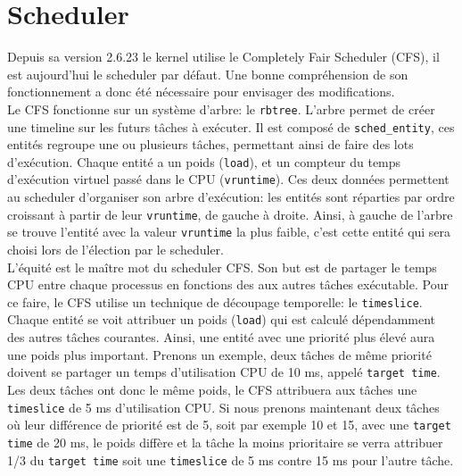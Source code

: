 \section*{Scheduler}

Depuis sa version 2.6.23 le kernel utilise le Completely Fair Scheduler (CFS), il est aujourd'hui le scheduler par défaut. Une bonne compréhension de son fonctionnement a donc été nécessaire pour envisager des modifications.
\\

Le CFS fonctionne sur un système d'arbre: le \verb|rbtree|. L'arbre permet de créer une timeline sur les futurs tâches à exécuter. 
Il est composé de \verb|sched_entity|, ces entités regroupe une ou plusieurs tâches, permettant ainsi de faire des lots d'exécution. Chaque entité a un poids (\verb|load|), et un compteur du temps d'exécution virtuel passé dans le CPU (\verb|vruntime|). Ces deux données permettent au scheduler d'organiser son arbre d'exécution: les entités sont réparties par ordre croissant à partir de leur \verb|vruntime|, de gauche à droite. Ainsi, à gauche de l'arbre se trouve l'entité avec la valeur \verb|vruntime| la plus faible, c'est cette entité qui sera choisi lors de l'élection par le scheduler.
\\

L'équité est le maître mot du scheduler CFS. Son but est de partager le temps CPU entre chaque processus en fonctions des aux autres tâches exécutable. Pour ce faire, le CFS utilise un technique de découpage temporelle: le \verb|timeslice|. Chaque entité se voit attribuer un poids (\verb|load|) qui est calculé dépendamment des autres tâches courantes. Ainsi, une entité avec une priorité plus élevé aura une poids plus important. Prenons un exemple, deux tâches de même priorité doivent se partager un temps d'utilisation CPU de 10 ms, appelé \verb|target time|. Les deux tâches ont donc le même poids, le CFS attribuera aux tâches une \verb|timeslice| de 5 ms d'utilisation CPU. Si nous prenons maintenant deux tâches où leur différence de priorité est de 5, soit par exemple 10 et 15, avec une \verb|target time| de 20 ms, le poids diffère et la tâche la moins prioritaire se verra attribuer 1/3 du \verb|target time| soit une \verb|timeslice| de 5 ms contre 15 ms pour l'autre tâche.
\\

